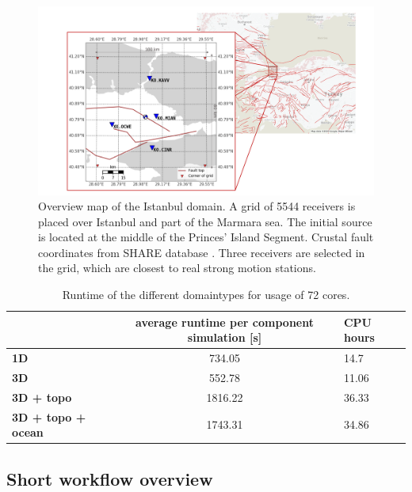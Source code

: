 \documentclass[../Text/00main.tex]{subfiles}
\begin{document}
\begin{figure}
    \centering
    \includegraphics[width=.75\linewidth]{images_methods/overview_receivergrid_istanbul.png}
    \caption{Overview map of the Istanbul domain. A grid of 5544 receivers is placed over Istanbul and part of the Marmara sea. The initial source is located at the middle of the Princes' Island Segment. Crustal fault coordinates from SHARE database \cite{basilic2013european}. Three receivers are selected in the grid, which are closest to real strong motion stations.}
    \label{fig:overviewfig_grid_istanbul}
\end{figure}


\begin{table}[]
\caption{Runtime of the different domaintypes for usage of 72 cores.}
\begin{tabular}{@{}lcl@{}}
\toprule
                           & \textbf{average runtime per component simulation {[}s{]}} & \textbf{CPU hours} \\ \midrule
\textbf{1D}                & 734.05                                                    & 14.7               \\
\textbf{3D}                & 552.78                                                    & 11.06              \\
\textbf{3D +  topo}        & 1816.22                                                   & 36.33              \\
\textbf{3D + topo + ocean} & 1743.31                                                    & 34.86              \\ \bottomrule
\end{tabular}
\end{table}

\subsection{Short workflow overview}
\end{document}
